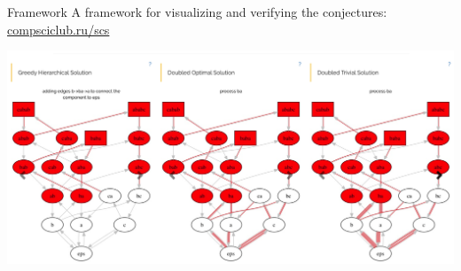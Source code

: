 \begin{frame}{Framework}
A framework for visualizing and verifying the conjectures:
\alert{\url{compsciclub.ru/scs}}

\includegraphics[width=\textwidth]{framework.png}
\end{frame}